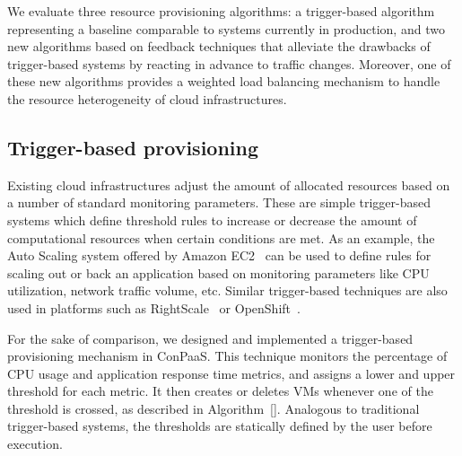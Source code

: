 We evaluate three resource provisioning algorithms: a trigger-based
algorithm representing a baseline comparable to systems currently in
production, and two new algorithms based on feedback techniques that alleviate
the drawbacks of trigger-based systems by reacting in advance to traffic changes. 
Moreover, one of these new algorithms provides a weighted load balancing mechanism to
handle the resource heterogeneity of cloud infrastructures.


\subsection*{Trigger-based provisioning}




Existing cloud infrastructures adjust the amount of allocated
resources based on a number of standard monitoring parameters.  These
are simple trigger-based systems which define threshold rules to
increase or decrease the amount of computational resources when
certain conditions are met. As an example, the Auto Scaling system
offered by Amazon EC2~\cite{amazonEC2} can be used to define rules for
scaling out or back an application based on monitoring parameters like
CPU utilization, network traffic volume, etc. Similar trigger-based
techniques are also used in platforms such as
RightScale~\cite{right-scale} or OpenShift~\cite{openshift}.

For the sake of comparison, we designed and implemented a
trigger-based provisioning mechanism in ConPaaS. This technique
monitors the percentage of CPU usage and application response time metrics, and assigns
a lower and upper threshold for each metric. It then creates or
deletes VMs whenever one of the threshold is crossed, as described in Algorithm~\ref{}. Analogous to traditional trigger-based systems, the thresholds
are statically defined by the user before execution.

